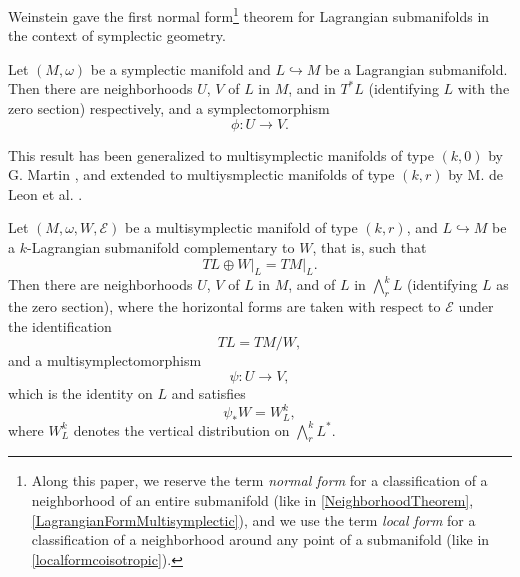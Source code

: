 Weinstein gave the first normal form\footnote{Along this paper, we reserve the term \textit{normal form} for a classification of a neighborhood of an entire submanifold (like in \cref{NeighborhoodTheorem}, \cref{LagrangianFormMultisymplectic}), and we use the term \textit{local form} for a classification of a neighborhood around any point of a submanifold (like in \cref{localformcoisotropic}).} theorem for Lagrangian submanifolds in the context of symplectic geometry.

\begin{theorem}\label{NeighborhoodTheorem} Let $(M, \omega)$ be a symplectic manifold and $L \hookrightarrow M$ be a Lagrangian submanifold. Then there are neighborhoods $U$, $V$ of $L$ in $M$, and in $T^\ast L$ (identifying $L$ with the zero section) respectively, and a symplectomorphism $$\phi: U \rightarrow V.$$
\end{theorem}

This result has been generalized to multisymplectic manifolds of type $(k,0)$ by G. Martin \cite{Martin1988ADT}, and extended to multiysmplectic manifolds of type $(k,r)$ by M. de Leon et al. \cite{deleon2003tulczyjews}.

\begin{theorem}\label{LagrangianFormMultisymplectic}\label{normalformlagrangian} Let $(M, \omega, W, \mathcal{E})$ be a multisymplectic manifold of type $(k,r)$, and $L \hookrightarrow M$ be a $k$-Lagrangian submanifold complementary to $W$, that is, such that $$TL \oplus W \big |_L = TM \big |_L.$$ Then there are neighborhoods $U$, $V$ of $L$ in $M$, and of $L$ in $\bigwedge^k_r L$ (identifying $L$ as the zero section), where the horizontal forms are taken with respect to $\mathcal{E}$ under the identification $$TL = TM/ W,$$ and a multisymplectomorphism $$\psi: U \rightarrow V,$$ which is the identity on $L$ and satisfies $$\psi_\ast W = W^k_L,$$ where $W_L^k$ denotes the vertical distribution on $\bigwedge^k_r L^\ast.$
\end{theorem}

